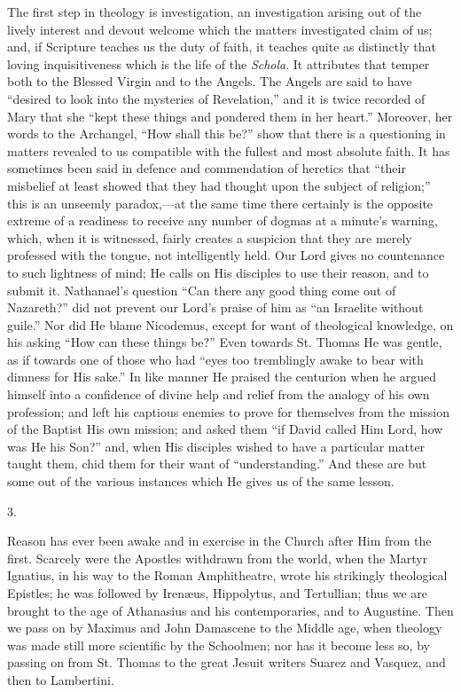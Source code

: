 The first step in theology is investigation, an investigation
arising out of the lively interest and devout welcome which the
matters investigated claim of us; and, if Scripture teaches us the
duty of faith, it teaches quite as distinctly that loving
inquisitiveness which is the life of the \emph{Schola}. It attributes
that temper both to the Blessed Virgin and to the Angels. The Angels
are said to have ``desired to look into the mysteries of
Revelation,'' and it is twice recorded of Mary that she ``kept
these things and pondered them in her heart.'' Moreover, her words
to the Archangel, ``How shall this be?'' show that there is a
questioning in matters revealed to us compatible with the fullest and
most absolute faith. It has sometimes been said in defence and
commendation of heretics that ``their misbelief at least showed
that they had thought upon the subject of religion;'' this is an
unseemly paradox,—at the same time there certainly is the opposite
extreme of a readiness to receive any number of dogmas at a minute's
warning, which, when it is witnessed, fairly creates a suspicion that
they are merely professed with the tongue, not intelligently held. Our
Lord gives no countenance to such lightness of mind; He calls on His
disciples to use their reason, and to submit it. Nathanael's question
``Can there any good thing come out of Nazareth?'' did not
prevent our Lord's praise of him as ``an Israelite without
guile.'' Nor did He blame Nicodemus, except for want of
theological knowledge, on his asking ``How can these things
be?'' Even towards St. Thomas He was gentle, as if towards one of
those who had ``eyes too tremblingly awake to bear with dimness
for His sake.'' In like manner He praised the centurion when he
argued himself into a confidence of divine help and relief from the
analogy of his own profession; and left his captious enemies to prove
for themselves from the mission of the Baptist His own mission; and
asked them ``if David called Him Lord, how was He his Son?''
and, when His disciples wished to have a particular matter taught
them, chid them for their want of ``understanding.'' And these
are but some out of the various instances which He gives us of the
same lesson.

3.

Reason has ever been awake and in exercise in the Church after Him
from the first. Scarcely were the Apostles withdrawn from the world,
when the Martyr Ignatius, in his way to the Roman Amphitheatre, wrote
his strikingly theological Epistles; he was followed by Irenæus,
Hippolytus, and Tertullian; thus we are brought to the age of
Athanasius and his contemporaries, and to Augustine. Then we pass on
by Maximus and John Damascene to the Middle age, when theology was
made still more scientific by the Schoolmen; nor has it become less
so, by passing on from St. Thomas to the great Jesuit writers Suarez
and Vasquez, and then to Lambertini.

